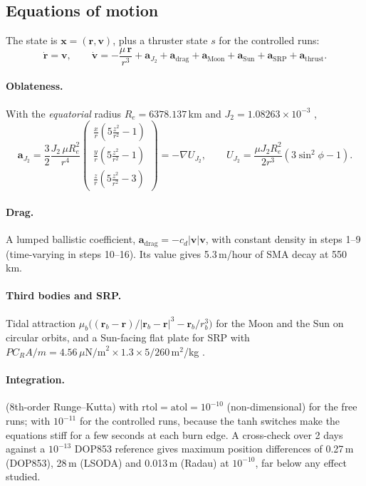 \documentclass[11pt,a4paper]{article}
\newcommand{\code}[1]{\texttt{\detokenize{#1}}}
\begin{document}
\subsection{Equations of motion}
The state is $\mathbf x = (\mathbf r,\mathbf v)$, plus a thruster state $s$ for the controlled runs:
\begin{equation}
  \dot{\mathbf r} = \mathbf v,\qquad
  \dot{\mathbf v} = -\frac{\mu\,\mathbf r}{r^3} + \mathbf a_{J_2} + \mathbf a_{\text{drag}} + \mathbf a_{\text{Moon}}
   + \mathbf a_{\text{Sun}} + \mathbf a_{\text{SRP}} + \mathbf a_{\text{thrust}} .
\end{equation}
\paragraph{Oblateness.} With the \emph{equatorial} radius $R_e = 6378.137$\,km and $J_2 = 1.08263\times10^{-3}$
\cite{vallado_book},
\begin{equation}
  \mathbf a_{J_2} = \frac{3}{2}\frac{J_2\,\mu R_e^2}{r^4}
  \begin{pmatrix} \tfrac{x}{r}(5\tfrac{z^2}{r^2}-1)\\ \tfrac{y}{r}(5\tfrac{z^2}{r^2}-1)\\ \tfrac{z}{r}(5\tfrac{z^2}{r^2}-3)\end{pmatrix}
  = -\nabla U_{J_2},\qquad U_{J_2} = \frac{\mu J_2 R_e^2}{2 r^3}(3\sin^2\phi - 1).
\end{equation}
\paragraph{Drag.} A lumped ballistic coefficient, $\mathbf a_{\text{drag}} = -c_d|\mathbf v|\mathbf v$, with constant
density in steps 1--9 (time-varying in steps 10--16). Its value gives 5.3\,m/hour of SMA decay at 550\,km.
\paragraph{Third bodies and SRP.} Tidal attraction $\mu_b\big((\mathbf r_b-\mathbf r)/|\mathbf r_b-\mathbf r|^3 -
\mathbf r_b/r_b^3\big)$ for the Moon and the Sun on circular orbits, and a Sun-facing flat plate for SRP with
$P C_R A/m = 4.56\,\mu\text{N/m}^2 \times 1.3 \times 5/260$\,m$^2$/kg \cite{montenbruck}.
\paragraph{Integration.} \code{DOP853} (8th-order Runge--Kutta) with $\text{rtol} = \text{atol} = 10^{-10}$
(non-dimensional) for the free runs; \code{LSODA} \cite{petzold} with $10^{-11}$ for the controlled runs, because the
tanh switches make the equations stiff for a few seconds at each burn edge. A cross-check over 2 days against a
$10^{-13}$ DOP853 reference gives maximum position differences of 0.27\,m (DOP853), 28\,m (LSODA) and 0.013\,m (Radau) at
$10^{-10}$, far below any effect studied.
\end{document}
